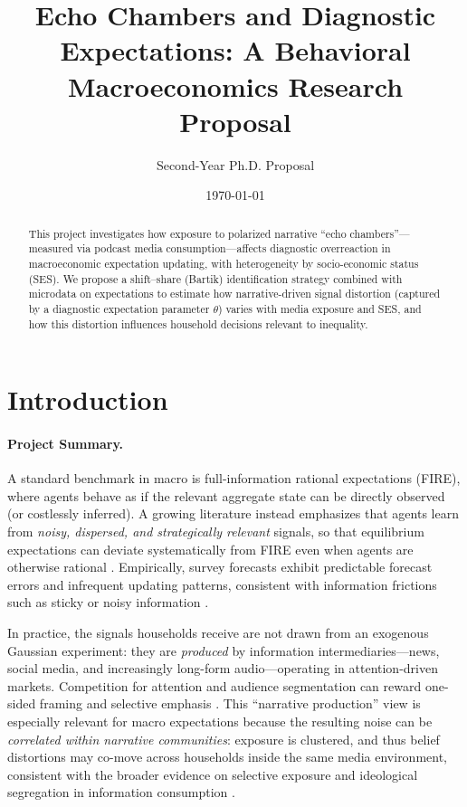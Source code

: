 \documentclass[12pt]{article}
\title{Echo Chambers and Diagnostic Expectations: A Behavioral Macroeconomics Research Proposal} \author{Second-Year Ph.D. Proposal} \date{\today}
\begin{document}
\maketitle
\begin{abstract}
    This project investigates how exposure to polarized narrative ``echo chambers''---measured via podcast media consumption---affects diagnostic overreaction in macroeconomic expectation updating, with heterogeneity by socio-economic status (SES). We propose a shift--share (Bartik) identification strategy combined with microdata on expectations to estimate how narrative-driven signal distortion (captured by a diagnostic expectation parameter $\theta$) varies with media exposure and SES, and how this distortion influences household decisions relevant to inequality.
\end{abstract}


\section{Introduction}

\paragraph{Project Summary.}

A standard benchmark in macro is full-information rational expectations (FIRE), where agents behave as if the relevant aggregate state can be directly observed (or costlessly inferred). A growing literature instead emphasizes that agents learn from \emph{noisy, dispersed, and strategically relevant} signals, so that equilibrium expectations can deviate systematically from FIRE even when agents are otherwise rational \citep{AngeletosLian2018,Lorenzoni2009DemandShocks}. Empirically, survey forecasts exhibit predictable forecast errors and infrequent updating patterns, consistent with information frictions such as sticky or noisy information \citep{CoibionGorodnichenko2015,MankiwReis2002StickyInfoVsStickyPrices,Carroll2003MacroExpectationsHouseholdsForecasters}.

In practice, the signals households receive are not drawn from an exogenous Gaussian experiment: they are \emph{produced} by information intermediaries---news, social media, and increasingly long-form audio---operating in attention-driven markets. Competition for attention and audience segmentation can reward one-sided framing and selective emphasis \citep{Mullainathan2005,GentzkowShapiro2010,Shiller2017}. This ``narrative production'' view is especially relevant for macro expectations because the resulting noise can be \emph{correlated within narrative communities}: exposure is clustered, and thus belief distortions may co-move across households inside the same media environment, consistent with the broader evidence on selective exposure and ideological segregation in information consumption \citep{BakshyMessingAdamic2015,GonzalezBailonEtAl2023,MartinYurukoglu2017}.
\end{document}
